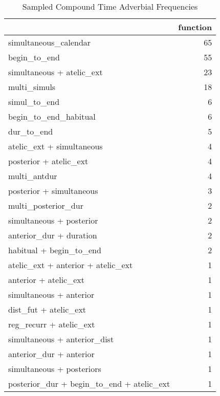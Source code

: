\begin{table}[htbp!]
\centering
\caption{Sampled Compound Time Adverbial Frequencies}
\label{table:compound_funct_ct}
\begin{tabular}{lr}
\toprule
{} &  function \\
\midrule
simultaneous\_calendar                     &        65 \\
begin\_to\_end                              &        55 \\
simultaneous + atelic\_ext                 &        23 \\
multi\_simuls                              &        18 \\
simul\_to\_end                              &         6 \\
begin\_to\_end\_habitual                     &         6 \\
dur\_to\_end                                &         5 \\
atelic\_ext + simultaneous                 &         4 \\
posterior + atelic\_ext                    &         4 \\
multi\_antdur                              &         4 \\
posterior + simultaneous                  &         3 \\
multi\_posterior\_dur                       &         2 \\
simultaneous + posterior                  &         2 \\
anterior\_dur + duration                   &         2 \\
habitual + begin\_to\_end                   &         2 \\
atelic\_ext + anterior + atelic\_ext        &         1 \\
anterior + atelic\_ext                     &         1 \\
simultaneous + anterior                   &         1 \\
dist\_fut + atelic\_ext                     &         1 \\
reg\_recurr + atelic\_ext                   &         1 \\
simultaneous + anterior\_dist              &         1 \\
anterior\_dur + anterior                   &         1 \\
simultaneous + posteriors                 &         1 \\
posterior\_dur + begin\_to\_end + atelic\_ext &         1 \\

\end{tabular}
\end{table}
